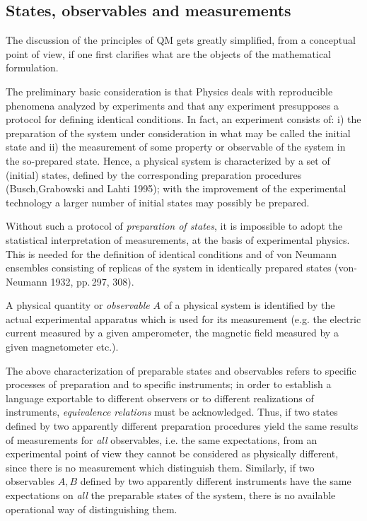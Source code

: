 \documentclass[12pt]{article}
\begin{document}
\subsection{States, observables and measurements}  

The discussion of the principles of QM gets greatly simplified, from a conceptual point of view, if one first clarifies what are the objects of the mathematical formulation.

The preliminary basic consideration is that Physics deals with reproducible phenomena analyzed by experiments and that any experiment  presupposes a protocol for defining identical  conditions. In fact, an experiment consists of: i) the preparation of the system under consideration in what may be called the initial  state and ii) the measurement of some property or observable of the system  in the so-prepared state. 
Hence,   a physical system is characterized by a set of (initial) states, defined by the corresponding preparation procedures  (Busch,Grabowski and Lahti 1995); with the improvement of the experimental technology a larger number of initial states may possibly be prepared.  

Without such a protocol of {\em preparation of states}, it is impossible  to adopt the statistical interpretation of measurements,  at the basis of experimental physics. This is needed for the definition of  identical conditions and of von Neumann ensembles consisting of replicas of the system in identically prepared states (von-Neumann 1932, pp.\,297, 308). 
 

 
A physical quantity or {\em observable} $A$ of a physical system is identified by the actual experimental apparatus which is used for its measurement (e.g. the electric current measured by a given amperometer, the magnetic field measured by a given magnetometer etc.). 

The above characterization of preparable states and observables refers to specific  processes of preparation  and to specific instruments;  in order to establish a language exportable to different observers or to different realizations of instruments, {\em equivalence relations} must be acknowledged. 
Thus, if two states defined by two apparently different preparation procedures  yield the same results of measurements for {\em all } observables, i.e. the same expectations, from an experimental point of view they cannot be considered as physically different, since there is no measurement which distinguish them.
Similarly, if two observables $A, B$  defined by two apparently different instruments have the same expectations on {\em all} the preparable states of the system, there is no available operational way of distinguishing them. 
\end{document}
